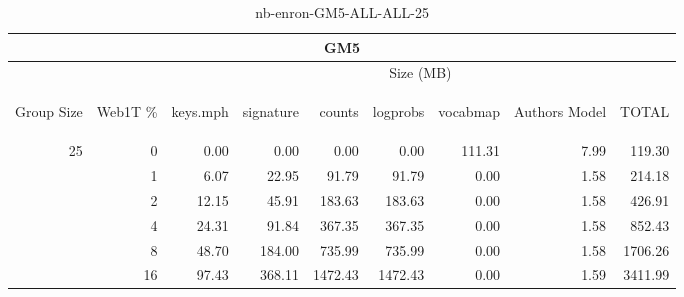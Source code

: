 \begin{center}
\begin{table}[htbp]
\begin{tabular}{ | r | r | r | r | r | r | r | r | r |}
\hline
\multicolumn{9}{|c|}{GM5}\\
\hline
 & & \multicolumn{7}{|c|}{Size (MB)}\\ \cline{3-9}
\begin{sideways}Group Size\end{sideways} & \begin{sideways}Web1T \% \end{sideways} & \begin{sideways}keys.mph\end{sideways} & \begin{sideways}signature\end{sideways} & \begin{sideways}counts\end{sideways} & \begin{sideways}logprobs\end{sideways} & \begin{sideways}vocabmap\end{sideways} & \begin{sideways}Authors Model \end{sideways} & \begin{sideways}TOTAL\end{sideways}\\
\hline
\multirow{5}{*}{25}
 & 0 & 0.00 & 0.00 & 0.00 & 0.00 & 111.31 & 7.99 & 119.30\\ \cline{2-9}
 & 1 & 6.07 & 22.95 & 91.79 & 91.79 & 0.00 & 1.58 & 214.18\\ \cline{2-9}
 & 2 & 12.15 & 45.91 & 183.63 & 183.63 & 0.00 & 1.58 & 426.91\\ \cline{2-9}
 & 4 & 24.31 & 91.84 & 367.35 & 367.35 & 0.00 & 1.58 & 852.43\\ \cline{2-9}
 & 8 & 48.70 & 184.00 & 735.99 & 735.99 & 0.00 & 1.58 & 1706.26\\ \cline{2-9}
 & 16 & 97.43 & 368.11 & 1472.43 & 1472.43 & 0.00 & 1.59 & 3411.99\\ \cline{2-9}
\hline
\end{tabular}
\caption{nb-enron-GM5-ALL-ALL-25}
\label{table:nb-enron-GM5-ALL-ALL-25}
\end{table}
\end{center}

